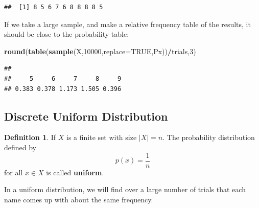 \documentclass[
]{book}
\newenvironment{Shaded}{\begin{snugshade}}{\end{snugshade}}
\newcommand{\AttributeTok}[1]{\textcolor[rgb]{0.13,0.29,0.53}{#1}}
\newcommand{\ConstantTok}[1]{\textcolor[rgb]{0.56,0.35,0.01}{#1}}
\newcommand{\DecValTok}[1]{\textcolor[rgb]{0.00,0.00,0.81}{#1}}
\newcommand{\FunctionTok}[1]{\textcolor[rgb]{0.13,0.29,0.53}{\textbf{#1}}}
\newcommand{\NormalTok}[1]{#1}
\newcommand{\SpecialCharTok}[1]{\textcolor[rgb]{0.81,0.36,0.00}{\textbf{#1}}}
\theoremstyle{definition}
\newtheorem{definition}{Definition}[chapter]
\theoremstyle{definition}
\theoremstyle{definition}
\theoremstyle{definition}
\theoremstyle{remark}
\begin{document}
\begin{verbatim}
##  [1] 8 5 6 7 6 8 8 8 8 5
\end{verbatim}

If we take a large sample, and make a relative frequency table of the results, it should be close to the probability table:

\begin{Shaded}
\begin{Highlighting}[]
\FunctionTok{round}\NormalTok{(}\FunctionTok{table}\NormalTok{(}\FunctionTok{sample}\NormalTok{(X,}\DecValTok{10000}\NormalTok{,}\AttributeTok{replace=}\ConstantTok{TRUE}\NormalTok{,Px))}\SpecialCharTok{/}\NormalTok{trials,}\DecValTok{3}\NormalTok{)}
\end{Highlighting}
\end{Shaded}

\begin{verbatim}
## 
##     5     6     7     8     9 
## 0.383 0.378 1.173 1.505 0.396
\end{verbatim}

\subsection{Discrete Uniform Distribution}\label{discrete-uniform-distribution}

\begin{definition}
\protect\hypertarget{def:discrete-uniform}{}\label{def:discrete-uniform}If \(X\) is a finite set with size \(|X| = n\). The probability distribution defined by \[p(x) = \frac{1}{n}\] for all \(x \in X\) is called \textbf{uniform}.
\end{definition}

In a uniform distribution, we will find over a large number of trials that each name comes up with about the same frequency.
\end{document}

